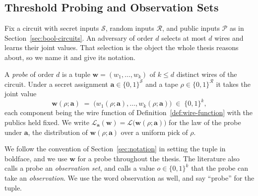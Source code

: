   \subsection{Threshold Probing and Observation Sets}
  \label{sec:t-threshold}

  Fix a circuit with secret inputs $\mathcal{S}$, random inputs $\mathcal{R}$, and
  public inputs $\mathcal{P}$ as in Section~\ref{sec:bool-circuits}. An
  adversary of order $d$ selects at most $d$ wires and learns
  their joint values. That selection is the object the whole thesis reasons about,
  so we name it and give its notation.

  \begin{definition}[Probe]
  \label{def:probe}
  A \emph{probe} of order $d$ is a tuple
  $\mathbf{w} = (w_1, \dots, w_k)$ of $k \le d$ distinct wires of the circuit. Under
  a secret assignment $\mathbf{a} \in \{0,1\}^{\mathcal{S}}$ and a tape
  $\rho \in \{0,1\}^{\mathcal{R}}$ it takes the joint value
  \[
    \mathbf{w}(\rho; \mathbf{a}) \;=\;
      \big(w_1(\rho; \mathbf{a}), \dots, w_k(\rho; \mathbf{a})\big)
      \;\in\; \{0,1\}^{k} ,
  \]
  each component being the wire function of Definition~\ref{def:wire-function}
  with the publics held fixed. We write
  $\mathcal{L}_{\mathbf{a}}(\mathbf{w}) = \mathcal{L}\big(\mathbf{w}(\rho; \mathbf{a})\big)$
  for the law of the probe under $\mathbf{a}$, the distribution of
  $\mathbf{w}(\rho; \mathbf{a})$ over a uniform pick of $\rho$.
  \end{definition}

  We follow the convention of Section~\ref{sec:notation} in setting the tuple in
  boldface, and we use $\mathbf{w}$ for a probe throughout the thesis. The
  literature also calls a probe an \emph{observation set}, and calls a value
  $o \in \{0,1\}^{k}$ that the probe can take an \emph{observation}. We use the
  word observation as well, and say ``probe'' for the tuple.


